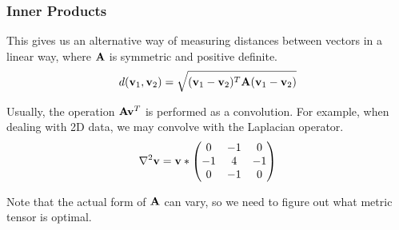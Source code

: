 \begin{frame}
\frametitle{Inner Products}
This gives us an alternative way of measuring distances between vectors in a linear way, where ${\bf A}$ is symmetric and positive definite.
\begin{eqnarray*}
d({\bf v}_1,{\bf v}_2) = \sqrt{({\bf v}_1 - {\bf v}_2)^T {\bf A} ({\bf v}_1 - {\bf v}_2)}
\end{eqnarray*}

Usually, the operation ${\bf A}{\bf v}^T$ is performed as a convolution.  For example, when dealing with 2D data, we may convolve with the Laplacian operator.
\begin{eqnarray*}
{\nabla}^2 {\bf v} = {\bf v} \ast \begin{pmatrix} 0 & -1 & 0\cr -1 & 4 & -1\cr 0 & -1 & 0\end{pmatrix}
\end{eqnarray*}

Note that the actual form of ${\bf A}$ can vary, so we need to figure out what metric tensor is optimal.
\end{frame}

